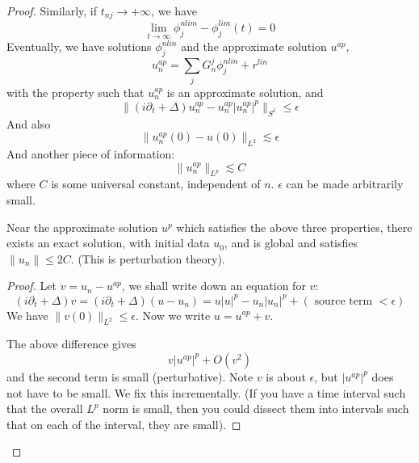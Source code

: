 \begin{proof}
    Similarly, if $t_{nj}\to+\infty$, we have
    \begin{equation*}
        \lim_{t\to\infty}\phi_j^{nlim}-\phi_j^{lim}(t)=0
    \end{equation*}
    Eventually, we have solutions $\phi_j^{nlin}$ and the approximate solution $u^{ap}$, 
    \begin{equation*}
        u_n^{ap}=\sum_jG_n^j\phi_j^{nlin}+r^{lin}
    \end{equation*}
    with the property such that $u_n^{ap}$ is an approximate solution, and 
    \begin{equation*}
        \|(i\partial_t+\Delta)u_n^{ap}-u_n^{ap}|u_n^{ap}|^p\|_{S^1}\leq\epsilon
    \end{equation*}
    And also 
    \begin{equation*}
        \|u_n^{ap}(0)-u(0)\|_{L^2}\lesssim\epsilon
    \end{equation*}
    And another piece of information:
    \begin{equation*}
        \|u_n^{ap}\|_{L^p}\lesssim C
    \end{equation*}
    where $C$ is some universal constant, independent of $n$. $\epsilon$ can be made arbitrarily small.

    \begin{proposition}
        Near the approximate solution $u^p$ which satisfies the above three properties, there exists an exact solution, with initial data $u_0$, and is global and satisfies $\|u_n\|\leq 2C$. (This is perturbation theory).
    \end{proposition}
    \begin{proof}
        Let $v=u_n-u^{ap}$, we shall write down an equation for $v$:
        \begin{equation*}
            (i\partial_t+\Delta)v=(i\partial_t+\Delta)(u-u_n)=u|u|^p-u_n|u_n|^p+(\text{ source term }<\epsilon)
        \end{equation*}
        We have $\|v(0)\|_{L^2}\leq\epsilon$. Now we write $u=u^{ap}+v$.

        The above difference gives
        \begin{equation*}
            v|u^{ap}|^p+O(v^2)
        \end{equation*}
        and the second term is small (perturbative). Note $v$ is about $\epsilon$, but $|u^{ap}|^p$ does not have to be small. We fix this incrementally. (If you have a time interval such that the overall $L^p$ norm is small, then you could dissect them into intervals such that on each of the interval, they are small).


\end{proof}
\end{proof}
